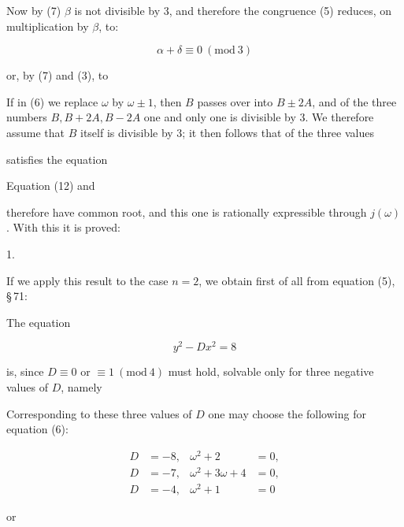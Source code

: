 
Now by (7) $\beta$ is not divisible by 3, and therefore the congruence
(5) reduces, on multiplication by $\beta$, to:

\[
\alpha+\delta \equiv 0\ (\mathrm{mod}\ 3)
\]

or, by (7) and (3), to


If in (6) we replace $\omega$ by $\omega\pm 1$, then $B$ passes over
into $B\pm 2A$, and of the three numbers $B, B+2A, B-2A$ one and only
one is divisible by 3. We therefore assume that $B$ itself is
divisible by 3; it then follows that of the three values


 satisfies the equation


Equation (12) and


therefore have  common root, and this one is rationally
expressible through $j(\omega)$. With this it is proved:

1. 

If we apply this result to the case $n = 2$, we obtain first of all
from equation (5), \S\,71:


The equation

\[
y^2-Dx^2 = 8
\]

is, since $D \equiv 0$ or $\equiv 1\ (\mathrm{mod}\ 4)$ must hold,
solvable only for three negative values of $D$, namely


Corresponding to these three values of $D$ one may choose the
following for equation (6):

\[
\begin{aligned}
D &= -8, & \omega^2+2 &= 0, \\
D &= -7, & \omega^2+3\omega+4 &= 0, \\
D &= -4, & \omega^2+1 &= 0
\end{aligned}
\]

or
